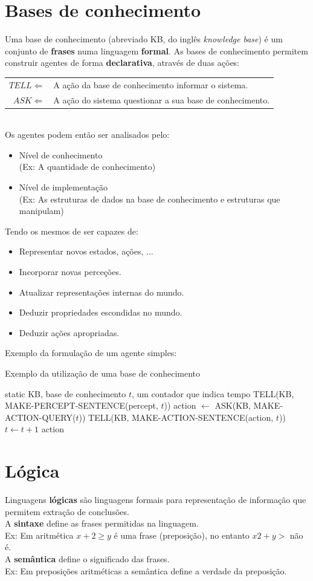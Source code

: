 \documentclass[]{report}
\begin{document}
\section{Bases de conhecimento}
Uma base de conhecimento (abreviado KB, do inglês \textit{knowledge base}) é um conjunto de \textbf{frases} numa linguagem \textbf{formal}.
As bases de conhecimento permitem construir agentes de forma \textbf{declarativa}, através de duas ações:\\
\begin{tabular}{r l}
$TELL \Leftarrow $ & A ação da base de conhecimento informar o sistema.\\
$ASK \Leftarrow $ & A ação do sistema questionar a sua base de conhecimento.
\end{tabular}\\[2mm]
Os agentes podem então ser analisados pelo:
\begin{itemize}
\item Nível de conhecimento\\
(Ex: A quantidade de conhecimento)
\item Nível de implementação\\
(Ex: As estruturas de dados na base de conhecimento e estruturas que manipulam)
\end{itemize}
Tendo os mesmos de ser capazes de:
\begin{itemize}
\item Representar novos estados, ações, ...
\item Incorporar novas perceções.
\item Atualizar representações internas do mundo.
\item Deduzir propriedades escondidas no mundo.
\item Deduzir ações apropriadas.
\end{itemize}
Exemplo da formulação de um agente simples:
\begin{algorithm}
\caption{Exemplo da utilização de uma base de conhecimento}
\begin{algorithmic}
\State    static KB, base de conhecimento
\State           $t$, um contador que indica tempo
\State    TELL(KB, MAKE-PERCEPT-SENTENCE(percept, $t$))
\State    action $\gets$ ASK(KB, MAKE-ACTION-QUERY($t$))
\State    TELL(KB, MAKE-ACTION-SENTENCE(action, $t$))
\State    $t \gets t + 1$
\State \Return action
\EndFunction
\end{algorithmic}
\end{algorithm}
\section{Lógica}
Linguagens \textbf{lógicas} são linguagens formais para representação de informação que permitem extração de conclusões.\\[2mm]
A \textbf{sintaxe} define as frases permitidas na linguagem.\\
\indent Ex: Em aritmética $x + 2 \geq y$ é uma frase (preposição), no entanto $x2 + y >$ não é.\\[2mm]
A \textbf{semântica} define o significado das frases.\\
\indent Ex: Em preposições aritméticas a semântica define a verdade da preposição.
\end{document}
